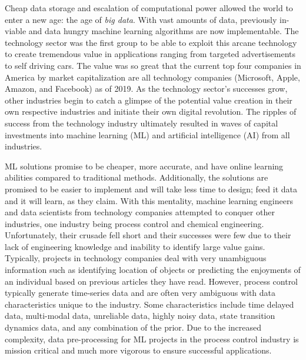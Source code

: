 %
% 

Cheap data storage and escalation of computational power allowed the world to enter a new age: the age of \textit{big data}. With vast amounts of data, previously in-viable and data hungry machine learning algorithms are now implementable.  The technology sector was the first group to be able to exploit this arcane technology to create tremendous value in applications ranging from targeted advertisements to self driving cars. The value was so great that the current top four companies in America by market capitalization are all technology companies (Microsoft, Apple, Amazon, and Facebook) as of 2019. As the technology sector's successes grow, other industries begin to catch a glimpse of the potential value creation in their own respective industries and initiate their own digital revolution. The ripples of success from the technology industry ultimately resulted in waves of capital investments into machine learning (ML) and artificial intelligence (AI) from all industries.

ML solutions promise to be cheaper, more accurate, and have online learning abilities compared to traditional methods.  Additionally, the solutions are promised to be easier to implement and will take less time to design; feed it data and it will learn, as they claim.  With this mentality, machine learning engineers and data scientists from technology companies attempted to conquer other industries, one industry being process control and chemical engineering. Unfortunately, their crusade fell short and their successes were few due to their lack of engineering knowledge and inability to identify large value gains.  Typically, projects in technology companies deal with very unambiguous information such as identifying location of objects or predicting the enjoyments of an individual based on previous articles they have read. However, process control typically generate time-series data and are often very ambiguous with data characteristics unique to the industry. Some characteristics include time delayed data, multi-modal data, unreliable data, highly noisy data, state transition dynamics data, and any combination of the prior.  Due to the increased complexity, data pre-processing for ML projects in the process control industry is mission critical and much more vigorous to ensure successful applications.

